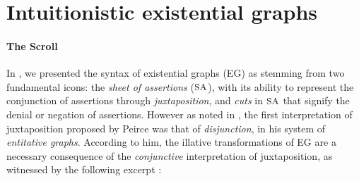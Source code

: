 






\section{Intuitionistic existential graphs}

\paragraph{The Scroll}

In , we presented the syntax of existential graphs (EG) as
stemming from two fundamental icons: the \emph{sheet of assertions} ($\small\textsc{SA}$),
with its ability to represent the conjunction of assertions through
\emph{juxtaposition}, and \emph{cuts} in $\small\textsc{SA}$ that signify the denial or
negation of assertions. However as noted in , the first
interpretation of juxtaposition proposed by Peirce was that of
\emph{disjunction}, in his system of \emph{entitative graphs}. According to him,
the illative transformations of EG are a necessary consequence of the
\emph{conjunctive} interpretation of juxtaposition, as witnessed by the
following excerpt \cite[p.~533]{peirce_prolegomena_1906}:

